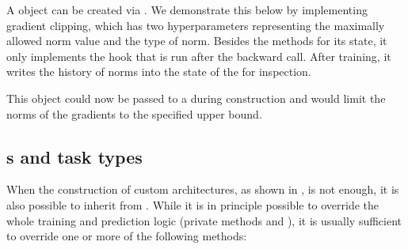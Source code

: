 \documentclass[article,shortnames]{jss}
\theoremstyle{definition}
\renewenvironment{CodeChunk}{\par\addvspace{0.6\baselineskip}\noindent\begin{minipage}{\linewidth}}{\end{minipage}\par\vspace{0.6\baselineskip}}
\begin{document}
A  object can be created via .
We demonstrate this below by implementing gradient clipping, which has two hyperparameters representing the maximally allowed norm value and the type of norm.
Besides the methods for its state, it only implements the hook that is run after the backward call.
After training, it writes the history of norms into the state of the  for inspection.

\begin{CodeChunk}
\end{CodeChunk}

This object could now be passed to a  during construction and would limit the norms of the gradients to the specified upper bound.

\subsection[Learners and task types]{s and task types}\label{sec:extending-learner-task}

When the construction of custom architectures, as shown in , is not enough, it is also possible to inherit from .
While it is in principle possible to override the whole training and prediction logic (private methods  and ), it is usually sufficient to override one or more of the following methods:
\end{document}
